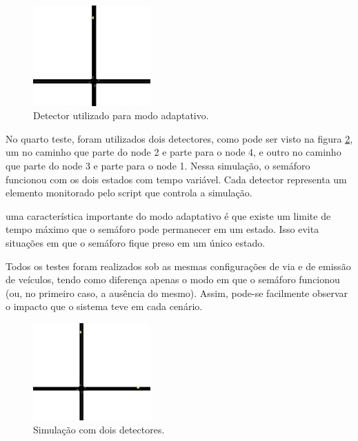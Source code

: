\begin{figure}[ht]
    \begin{center}
    \includegraphics[width=0.4\textwidth]{figuras/Simulation_3_Zoom.PNG}
    \end{center}
    \caption[Simulação com um detector veicular]{Detector utilizado para modo adaptativo.}
    \label{simulationThree}
\end{figure}

No quarto teste, foram utilizados dois detectores, como pode ser visto na figura \ref{simulationFour}, um no caminho que parte do node 2 e parte para o node 4, e outro no caminho que parte do node 3 e parte para o node 1. Nessa simulação, o semáforo funcionou com os dois estados com tempo variável. Cada detector representa um elemento monitorado pelo script que controla a simulação. 

uma característica importante do modo adaptativo é que existe um limite de tempo máximo que o semáforo pode permanecer em um estado. Isso evita situações em que o semáforo fique preso em um único estado.

Todos os testes foram realizados sob as mesmas configurações de via e de emissão de veículos, tendo como diferença apenas o modo em que o semáforo funcionou (ou, no primeiro caso, a ausência do mesmo). Assim, pode-se facilmente observar o impacto que o sistema teve em cada cenário.

\begin{figure}[ht]
    \begin{center}
    \includegraphics[width=0.4\textwidth]{figuras/Simulation_4_Zoom.PNG}
    \end{center}
    \caption[Simulação com dois detectores veicular]{Simulação com dois detectores.}
    \label{simulationFour}
\end{figure}